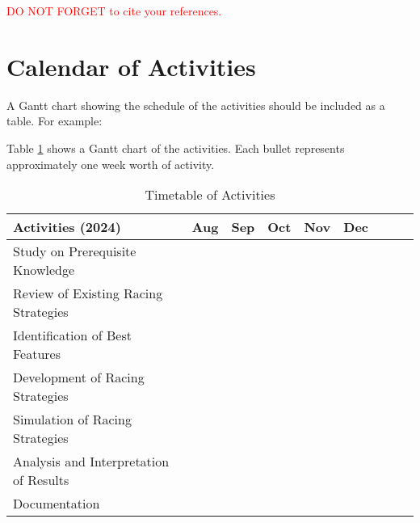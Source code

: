 \textcolor{red}{DO NOT FORGET to cite your references.}

\section{Calendar of Activities}

A Gantt chart showing the schedule of the activities should be included as a table. For example:

Table \ref{tab:timetableactivities} shows a Gantt chart of the activities.  Each bullet represents approximately
one week worth of activity.

%
%
\newcommand{\weekone}{\textbullet}
\newcommand{\weektwo}{\textbullet \textbullet}
\newcommand{\weekthree}{\textbullet \textbullet \textbullet}
\newcommand{\weekfour}{\textbullet \textbullet \textbullet \textbullet}

%
%
\begin{comment}
   \newcommand{\weekone}{$\star$}
   \newcommand{\weektwo}{$\star \star$}
   \newcommand{\weekthree}{$\star \star \star$}
   \newcommand{\weekfour}{$\star \star \star \star$ }
\end{comment}



\begin{table}[ht]   %
	\centering
	\caption{Timetable of Activities}
	\vspace{0.25em}
	\begin{tabular}{|p{2.5in}|c|c|c|c|c|c|c|c|} 
		\hline
		\centering Activities (2024) & Aug & Sep & Oct & Nov & Dec \\ 
		\hline
		Study on Prerequisite Knowledge & & & \weektwo & \weekfour & \\ 
		\hline
		Review of Existing Racing Strategies & \weektwo & \weekfour & \weekfour & \weekfour &  \\ 
		\hline
		Identification of Best Features & & & & \weekfour & \weektwo \\ 
		\hline
		Development of Racing Strategies & & & & \weektwo & \weekfour \\ 
		\hline
		Simulation of Racing Strategies & & & & \weektwo & \weekfour \\ 
		\hline
		Analysis and Interpretation of Results & & & & \weekfour & \weekfour \\ 
		\hline
		Documentation & & \weektwo & \weekfour & \weekfour & \weekfour \\ 
		\hline
	\end{tabular}
	\label{tab:timetableactivities}
\end{table}
